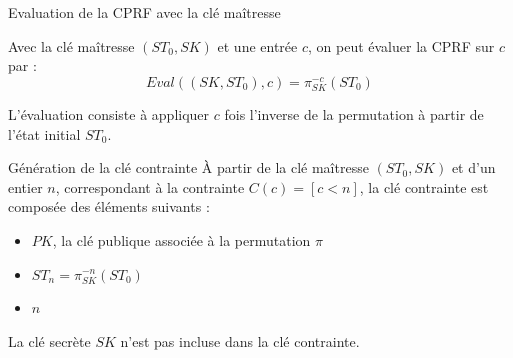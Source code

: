 \documentclass[9pt]{extarticle}
\begin{document}
\begin{defbox}{Evaluation de la CPRF avec la clé maîtresse}
    
Avec la clé maîtresse $(ST_0, SK)$ et une entrée $c$, on peut évaluer la CPRF sur $c$ par :
\[
Eval((SK, ST_0), c) = \pi_{SK}^{-c}(ST_0)
\]

L’évaluation consiste à appliquer $c$ fois l’inverse de la permutation à partir de l’état initial $ST_0$.

\begin{center}
\end{center}

\end{defbox}



\begin{defbox}{Génération de la clé contrainte}
À partir de la clé maîtresse $(ST_0, SK)$ et d’un entier $n$, correspondant à la contrainte
$C(c) = [c < n]$, la clé contrainte est composée des éléments suivants :
\begin{itemize}
  \item $PK$, la clé publique associée à la permutation $\pi$
  \item $ST_n = \pi_{SK}^{-n}(ST_0)$
  \item $n$
\end{itemize}

La clé secrète $SK$ n’est pas incluse dans la clé contrainte.
\end{defbox}
\end{document}
